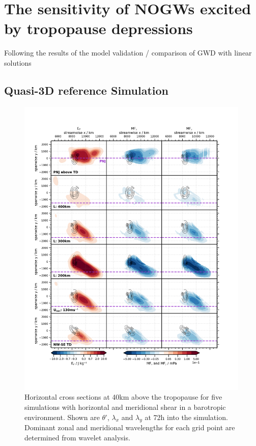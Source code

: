\chapter{The sensitivity of NOGWs excited by tropopause depressions}
\label{sec:resultsQ3D}


Following the results of the model validation / comparison of GWD with linear solutions




\section{Quasi-3D reference Simulation}
\label{sec:resultsq3D-reference}

\begin{figure}[tbp]
    \centering
    \includegraphics[width=0.99\textwidth]{figures_3D/waveletAna_fluxes_obs.png}
    \caption{Horizontal cross sections at 40km above the tropopause for five simulations with horizontal and meridional shear in a barotropic environment. Shown are $\theta$', $\lambda_x$ and $\lambda_y$ at 72h into the simulation. Dominant zonal and meridional wavelengths for each grid point are determined from wavelet analysis.}
\end{figure}

